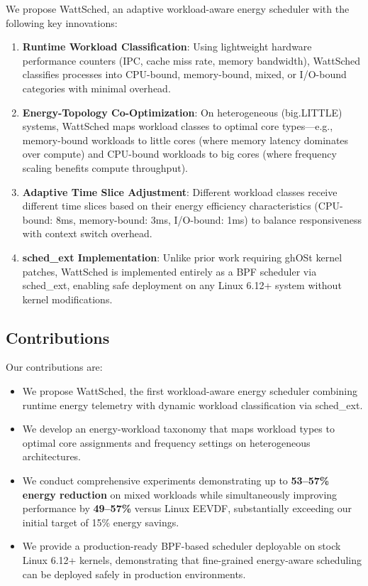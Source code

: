 \documentclass{article}
\begin{document}
We propose WattSched, an adaptive workload-aware energy scheduler with the following key innovations:

\begin{enumerate}
    \item \textbf{Runtime Workload Classification}: Using lightweight hardware performance counters (IPC, cache miss rate, memory bandwidth), WattSched classifies processes into CPU-bound, memory-bound, mixed, or I/O-bound categories with minimal overhead.
    
    \item \textbf{Energy-Topology Co-Optimization}: On heterogeneous (big.LITTLE) systems, WattSched maps workload classes to optimal core types---e.g., memory-bound workloads to little cores (where memory latency dominates over compute) and CPU-bound workloads to big cores (where frequency scaling benefits compute throughput).
    
    \item \textbf{Adaptive Time Slice Adjustment}: Different workload classes receive different time slices based on their energy efficiency characteristics (CPU-bound: 8ms, memory-bound: 3ms, I/O-bound: 1ms) to balance responsiveness with context switch overhead.
    
    \item \textbf{sched\_ext Implementation}: Unlike prior work requiring ghOSt kernel patches, WattSched is implemented entirely as a BPF scheduler via sched\_ext, enabling safe deployment on any Linux 6.12+ system without kernel modifications.
\end{enumerate}

\subsection{Contributions}

Our contributions are:
\begin{itemize}
    \item We propose WattSched, the first workload-aware energy scheduler combining runtime energy telemetry with dynamic workload classification via sched\_ext.
    
    \item We develop an energy-workload taxonomy that maps workload types to optimal core assignments and frequency settings on heterogeneous architectures.
    
    \item We conduct comprehensive experiments demonstrating up to \textbf{53--57\% energy reduction} on mixed workloads while simultaneously improving performance by \textbf{49--57\%} versus Linux EEVDF, substantially exceeding our initial target of 15\% energy savings.
    
    \item We provide a production-ready BPF-based scheduler deployable on stock Linux 6.12+ kernels, demonstrating that fine-grained energy-aware scheduling can be deployed safely in production environments.
\end{itemize}
\end{document}

